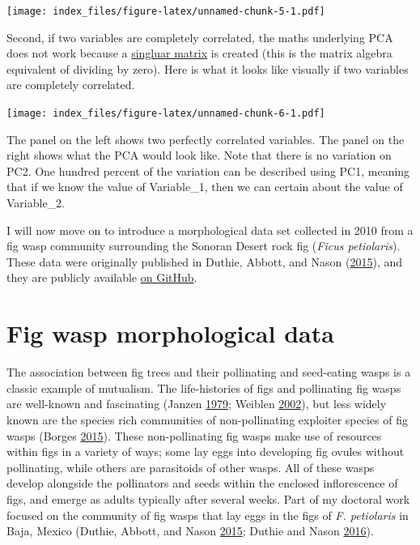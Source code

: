 \documentclass[]{article}
\begin{document}
\texttt{[image: index\_files/figure-latex/unnamed-chunk-5-1.pdf]}

Second, if two variables are completely correlated, the maths underlying
PCA does not work because a
\href{https://mathworld.wolfram.com/SingularMatrix.html}{singluar
matrix} is created (this is the matrix algebra equivalent of dividing by
zero). Here is what it looks like visually if two variables are
completely correlated.

\texttt{[image: index\_files/figure-latex/unnamed-chunk-6-1.pdf]}

The panel on the left shows two perfectly correlated variables. The
panel on the right shows what the PCA would look like. Note that there
is no variation on PC2. One hundred percent of the variation can be
described using PC1, meaning that if we know the value of Variable\_1,
then we can certain about the value of Variable\_2.

I will now move on to introduce a morphological data set collected in
2010 from a fig wasp community surrounding the Sonoran Desert rock fig
(\emph{Ficus petiolaris}). These data were originally published in
Duthie, Abbott, and Nason (\protect\hyperlink{ref-Duthie2015b}{2015}),
and they are publicly available
\href{https://github.com/StirlingCodingClub/ordination/tree/master/data}{on
GitHub}.

\hypertarget{fig-wasp-morphological-data}{%
\section{Fig wasp morphological
data}\label{fig-wasp-morphological-data}}

The association between fig trees and their pollinating and seed-eating
wasps is a classic example of mutualism. The life-histories of figs and
pollinating fig wasps are well-known and fascinating (Janzen
\protect\hyperlink{ref-Janzen1979}{1979}; Weiblen
\protect\hyperlink{ref-Weiblen2002}{2002}), but less widely known are
the species rich communities of non-pollinating exploiter species of fig
wasps (Borges \protect\hyperlink{ref-Borges2015}{2015}). These
non-pollinating fig wasps make use of resources within figs in a variety
of ways; some lay eggs into developing fig ovules without pollinating,
while others are parasitoids of other wasps. All of these wasps develop
alongside the pollinators and seeds within the enclosed inflorescence of
figs, and emerge as adults typically after several weeks. Part of my
doctoral work focused on the community of fig wasps that lay eggs in the
figs of \emph{F. petiolaris} in Baja, Mexico (Duthie, Abbott, and Nason
\protect\hyperlink{ref-Duthie2015b}{2015}; Duthie and Nason
\protect\hyperlink{ref-Duthie2016}{2016}).
\end{document}
